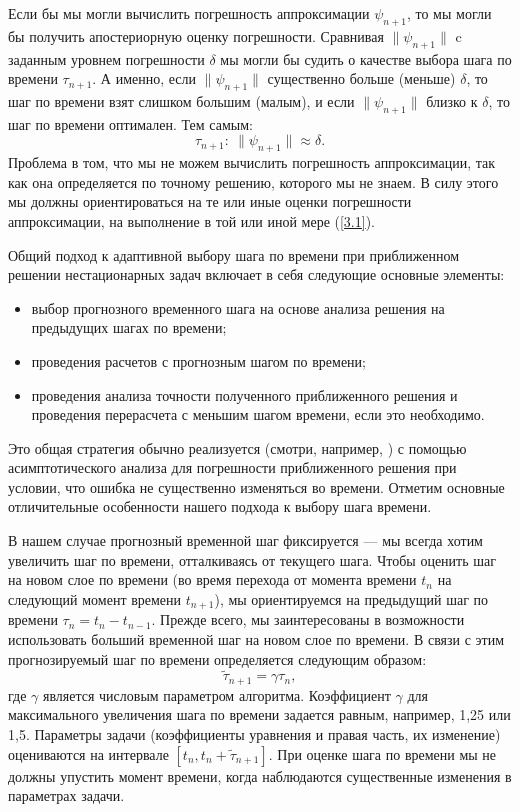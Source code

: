 \documentclass[12pt]{ncc}
\numberwithin{equation}{section}
\begin{document}
Если бы мы могли вычислить погрешность аппроксимации $\psi_{n+1}$, то мы могли бы получить апостериорную
оценку погрешности. Сравнивая $\|\psi_{n+1}\|$ c заданным уровнем погрешности  $\delta$ 
мы могли бы судить о качестве выбора шага по времени $\tau_{n+1}$.
А именно, если $\|\psi_{n+1}\|$ существенно больше (меньше) $\delta$, то шаг по времени взят слишком большим (малым),
и если $\|\psi_{n+1}\|$ близко к $\delta$, то шаг по времени оптимален.
Тем самым:
\begin{equation}\label{3.1}
  \tau_{n+1}: \ \|\psi_{n+1}\| \approx \delta .
\end{equation} 
Проблема в том, что мы не можем вычислить погрешность аппроксимации, так как она определяется
по точному решению, которого мы не знаем. В силу этого мы должны ориентироваться 
на те или иные оценки погрешности аппроксимации, на выполнение 
в той или иной мере (\ref{3.1}). 

Общий подход к адаптивной выбору шага по времени при приближенном 
решении нестационарных задач включает в себя следующие основные элементы:
\begin{itemize}
 \item выбор прогнозного временного шага на основе анализа
 решения на предыдущих шагах по времени;
 \item проведения расчетов с прогнозным шагом по времени;
 \item проведения анализа точности полученного приближенного решения и
  проведения перерасчета с меньшим шагом времени, если это необходимо.
\end{itemize} 
Это общая стратегия обычно реализуется (смотри, например,
\cite{ascher1998computer,Gear1971,HairerNorsettWanner1987})
с помощью асимптотического анализа для погрешности приближенного решения
при условии, что ошибка не существенно изменяться во времени.
Отметим основные отличительные особенности нашего подхода к выбору 
шага времени.

В нашем случае прогнозный временной шаг фиксируется --- мы всегда хотим
увеличить шаг по времени, отталкиваясь от текущего шага.
Чтобы оценить шаг на новом слое по времени 
(во время перехода от момента времени $t_{n}$ 
на следующий момент времени $t_{n+1}$),
мы ориентируемся на предыдущий шаг по времени $\tau_n = t_n - t_{n-1}$. 
Прежде всего, мы заинтересованы в возможности использовать больший временной шаг
на новом слое по времени. В связи с этим прогнозируемый шаг по времени определяется следующим образом:
\begin{equation}\label{3.2}
 \widetilde{\tau}_{n+1} = \gamma \tau_n , 
\end{equation} 
где $\gamma$  является числовым параметром алгоритма. 
Коэффициент $\gamma$  для максимального увеличения шага по времени
задается равным, например, 1,25 или 1,5.
Параметры задачи (коэффициенты уравнения и правая часть, их изменение) 
оцениваются на интервале  $[t_n, t_n + \widetilde{\tau}_{n+1}]$. 
При оценке шага по времени мы не должны упустить момент времени,
когда наблюдаются существенные изменения в параметрах задачи.
 
\end{document}
